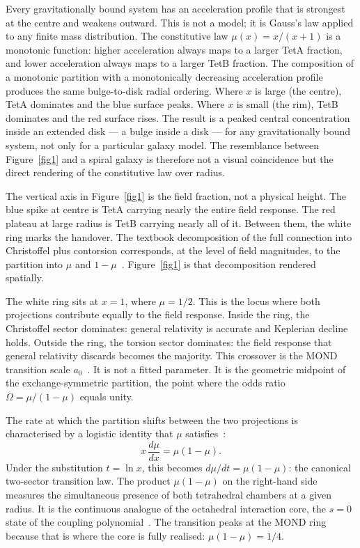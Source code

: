 \documentclass[twocolumn]{iopjournal}
\begin{document}
Every gravitationally bound system has an acceleration
profile that is strongest at the centre and weakens outward.
This is not a model; it is Gauss's law applied to any finite
mass distribution.  The constitutive law
$\mu(x) = x/(x{+}1)$ is a monotonic function: higher
acceleration always maps to a larger TetA fraction, and lower
acceleration always maps to a larger TetB fraction.  The
composition of a monotonic partition with a monotonically
decreasing acceleration profile produces the same
bulge-to-disk radial ordering.  Where $x$ is large (the
centre), TetA dominates and the blue surface peaks.  Where
$x$ is small (the rim), TetB dominates and the red surface
rises.  The result is a peaked central concentration inside
an extended disk --- a bulge inside a disk --- for any
gravitationally bound system, not only for a particular
galaxy model.  The resemblance between Figure~\ref{fig1} and
a spiral galaxy is therefore not a visual coincidence but the
direct rendering of the constitutive law over radius.

The vertical axis in Figure~\ref{fig1} is the field fraction,
not a physical height.  The blue spike at centre is TetA
carrying nearly the entire field response.  The red plateau at
large radius is TetB carrying nearly all of it.  Between them,
the white ring marks the handover.  The textbook decomposition
of the full connection into Christoffel plus contorsion
corresponds, at the level of field magnitudes, to the
partition into $\mu$ and
$1 - \mu$~\cite{Nelson2026b}.  Figure~\ref{fig1} is that
decomposition rendered spatially.

The white ring sits at $x = 1$, where $\mu = 1/2$.  This is
the locus where both projections contribute equally to the
field response.  Inside the ring, the Christoffel sector
dominates: general relativity is accurate and Keplerian
decline holds.  Outside the ring, the torsion sector
dominates: the field response that general relativity
discards becomes the majority.  This crossover is the MOND
transition scale $a_0$~\cite{Milgrom1983}.  It is not a
fitted parameter.  It is the geometric midpoint of the
exchange-symmetric partition, the point where the odds ratio
$\Omega = \mu/(1-\mu)$ equals unity.

The rate at which the partition shifts between the two
projections is characterised by a logistic identity that
$\mu$ satisfies~\cite{Nelson2026b}:
\begin{equation}
  x\,\frac{d\mu}{dx} = \mu(1 - \mu).
  \label{eq:logistic}
\end{equation}
Under the substitution $t = \ln x$, this becomes
$d\mu/dt = \mu(1-\mu)$: the canonical two-sector transition
law.  The product $\mu(1-\mu)$ on the right-hand side measures
the simultaneous presence of both tetrahedral chambers at a
given radius.  It is the continuous analogue of the octahedral
interaction core, the $s = 0$ state of the coupling
polynomial~\cite{Nelson2026b}.  The transition peaks at the
MOND ring because that is where the core is fully realised:
$\mu(1 - \mu) = 1/4$.
\end{document}
